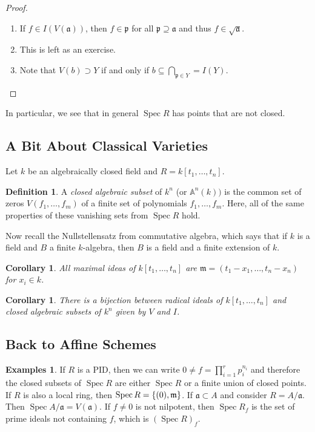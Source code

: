 \documentclass[leqno, openany]{memoir}
\newtheorem{cor}[thm]{Corollary}
\theoremstyle{definition}
\newtheorem{defn}[thm]{Definition}
\newtheorem{exms}[thm]{Examples}
\theoremstyle{remark}
\theoremstyle{plain}
\theoremstyle{definition}
\theoremstyle{remark}
\newcommand{\A}{\mathbb{A}}
\newcommand{\mf}[1]{\mathfrak{#1}}
\DeclareMathOperator{\Spec}{Spec}
\begin{document}
\begin{proof}
    \begin{enumerate}
        \item If $f \in I(V(\mf{a}))$, then $f \in \mf{p}$ for all $\mf{p} \supseteq \mf{a}$ and thus $f \in \sqrt{\mf{a}}$.
        \item This is left as an exercise.
        \item Note that $V(b) \supset Y$ if and only if $b \subseteq \bigcap_{\mf{p} \in Y} = I(Y)$.
    \end{enumerate}
\end{proof}

In particular, we see that in general $\Spec R$ has points that are not closed.

\subsection{A Bit About Classical Varieties}%
\label{sub:a_bit_about_classical_varieties}

Let $k$ be an algebraically closed field and $R = k[t_1, \ldots, t_n]$. 

\begin{defn}
    A \textit{closed algebraic subset} of $k^n$ (or $\A^n(k))$ is the common set of zeros $V(f_1, \ldots, f_m)$ of a finite set of polynomials $f_1, \ldots, f_m$. Here, all of the same properties of these vanishing sets from $\Spec R$ hold. 
\end{defn}

Now recall the Nullstellensatz from commutative algebra, which says that if $k$ is a field and $B$ a finite $k$-algebra, then $B$ is a field and a finite extension of $k$.

\begin{cor}
    All maximal ideas of $k[t_1, \ldots, t_n]$ are $\mf{m} = (t_1 - x_1, \ldots, t_n - x_n)$ for $x_i \in k$.
\end{cor}

\begin{cor}
    There is a bijection between radical ideals of $k[t_1, \ldots, t_n]$ and closed algebraic subsets of $k^n$ given by $V$ and $I$.
\end{cor}

\subsection{Back to Affine Schemes}%
\label{sub:back_to_affine_schemes}

\begin{exms}
If $R$ is a PID, then we can write $0 \neq f = \prod_{i=1}^r p_i^{n_i}$ and therefore the closed subsets of $\Spec R$ are either $\Spec R$ or a finite union of closed points. If $R$ is also a local ring, then $\Spec R = \qty{(0), \mf{m}}$. If $\mf{a} \subset A$ and consider $R = A/\mf{a}$. Then $\Spec A/\mf{a} = V(\mf{a})$. If $f \neq 0$ is not nilpotent, then $\Spec R_f$ is the set of prime ideals not containing $f$, which is ${(\Spec R)}_f$.
\end{exms}
\end{document}
